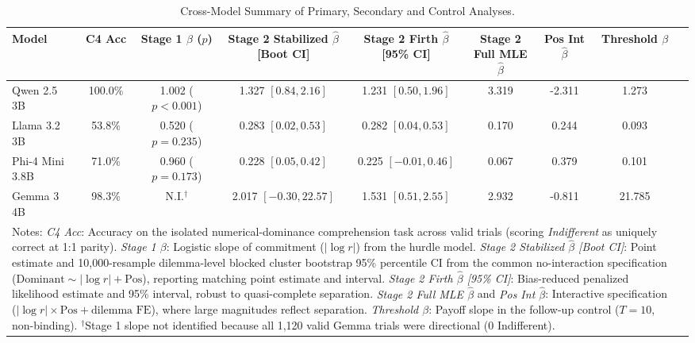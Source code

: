 \documentclass[10pt,journal,compsoc]{IEEEtran}
\begin{document}
\begin{table}[!htbp]
\centering
\caption{Cross-Model Summary of Primary, Secondary and Control Analyses.}
\label{tab:results_summary}
\begin{tabular}{@{}lcccccccc@{}}
\toprule
\textbf{Model} & \textbf{C4 Acc} & \textbf{Stage 1 $\beta$ ($p$)} & \textbf{Stage 2 Stabilized $\hat\beta$ [Boot CI]} & \textbf{Stage 2 Firth $\hat\beta$ [95\% CI]} & \textbf{Stage 2 Full MLE $\hat\beta$} & \textbf{Pos Int $\hat\beta$} & \textbf{Threshold $\beta$} \\
\midrule
Qwen 2.5 3B     & 100.0\% & 1.002 ($p<0.001$) & 1.327 $[0.84, 2.16]$   & 1.231 $[0.50, 1.96]$  & 3.319 & -2.311 & 1.273 \\
Llama 3.2 3B    & 53.8\%  & 0.520 ($p=0.235$) & 0.283 $[0.02, 0.53]$   & 0.282 $[0.04, 0.53]$  & 0.170 &  0.244 & 0.093 \\
Phi-4 Mini 3.8B & 71.0\%  & 0.960 ($p=0.173$) & 0.228 $[0.05, 0.42]$   & 0.225 $[-0.01, 0.46]$ & 0.067 &  0.379 & 0.101 \\
Gemma 3 4B      & 98.3\%  & N.I.$^\dagger$    & 2.017 $[-0.30, 22.57]$ & 1.531 $[0.51, 2.55]$  & 2.932 & -0.811 & 21.785 \\
\bottomrule
\multicolumn{8}{p{\textwidth}}{\footnotesize Notes: \textit{C4 Acc}: Accuracy on the isolated numerical-dominance comprehension task across valid trials (scoring \textit{Indifferent} as uniquely correct at 1:1 parity). \textit{Stage 1 $\beta$}: Logistic slope of commitment ($|\log r|$) from the hurdle model. \textit{Stage 2 Stabilized $\hat\beta$ [Boot CI]}: Point estimate and 10,000-resample dilemma-level blocked cluster bootstrap 95\% percentile CI from the common no-interaction specification ($\text{Dominant} \sim |\log r| + \text{Pos}$), reporting matching point estimate and interval. \textit{Stage 2 Firth $\hat\beta$ [95\% CI]}: Bias-reduced penalized likelihood estimate \cite{firth_1993} and 95\% interval, robust to quasi-complete separation. \textit{Stage 2 Full MLE $\hat\beta$} and \textit{Pos Int $\hat\beta$}: Interactive specification ($|\log r| \times \text{Pos} + \text{dilemma FE}$), where large magnitudes reflect separation. \textit{Threshold $\beta$}: Payoff slope in the follow-up control ($T=10$, non-binding). $^\dagger$Stage 1 slope not identified because all 1,120 valid Gemma trials were directional (0 Indifferent).}
\end{tabular}
\end{table}
\end{document}
